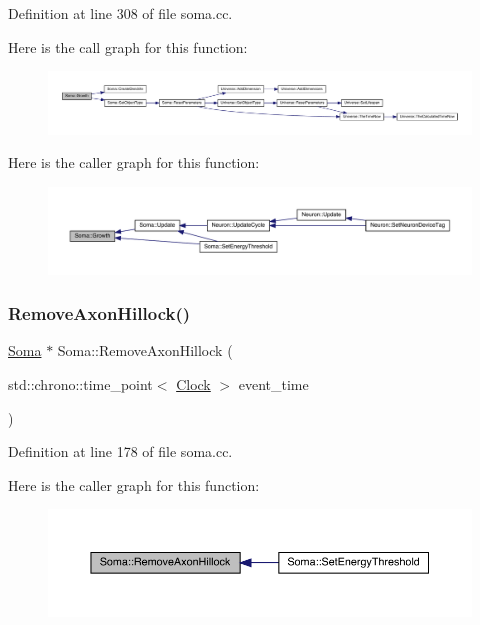 Definition at line 308 of file soma.\+cc.

Here is the call graph for this function\+:
\nopagebreak
\begin{figure}[H]
\begin{center}
\leavevmode
\includegraphics[width=350pt]{class_soma_aa6162ca8a98a14cf49ba8310db129d47_cgraph}
\end{center}
\end{figure}
Here is the caller graph for this function\+:
\nopagebreak
\begin{figure}[H]
\begin{center}
\leavevmode
\includegraphics[width=350pt]{class_soma_aa6162ca8a98a14cf49ba8310db129d47_icgraph}
\end{center}
\end{figure}
\mbox{\label{class_soma_a2f75c0f716fa1f74f70697db9dfcd562}} 
\subsubsection{\texorpdfstring{Remove\+Axon\+Hillock()}{RemoveAxonHillock()}}
{\footnotesize\ttfamily \hyperlink{class_soma}{Soma} $\ast$ Soma\+::\+Remove\+Axon\+Hillock (\begin{DoxyParamCaption}\item[{std\+::chrono\+::time\+\_\+point$<$ \hyperlink{universe_8h_a0ef8d951d1ca5ab3cfaf7ab4c7a6fd80}{Clock} $>$}]{event\+\_\+time }\end{DoxyParamCaption})}



Definition at line 178 of file soma.\+cc.

Here is the caller graph for this function\+:
\nopagebreak
\begin{figure}[H]
\begin{center}
\leavevmode
\includegraphics[width=350pt]{class_soma_a2f75c0f716fa1f74f70697db9dfcd562_icgraph}
\end{center}
\end{figure}
\mbox{\label{class_soma_a7281585d74015a2549a19df6cb16e3fb}} 
